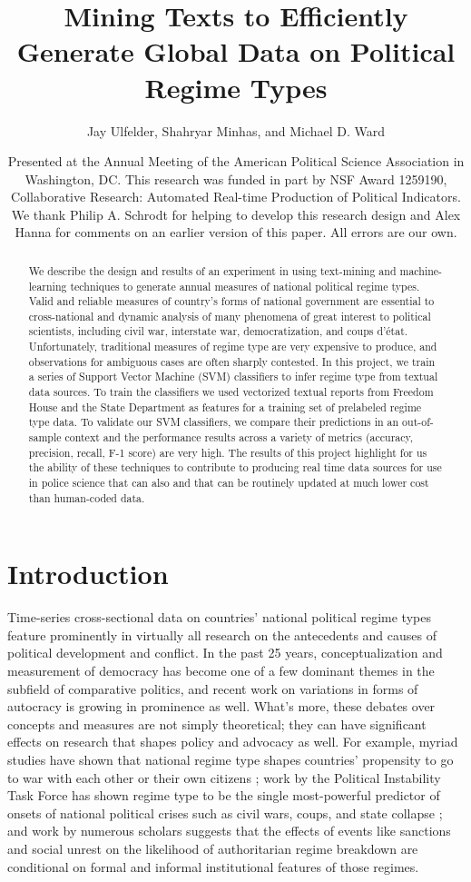 \documentclass[pdftex,12pt,fullpage,oneside]{amsart}
\title{Mining Texts to Efficiently Generate Global Data on Political Regime Types}
\author{Jay Ulfelder, Shahryar Minhas, and Michael D. Ward}
\date{Presented at the Annual Meeting of the American Political Science Association in Washington, DC. This research was funded in part by NSF Award 1259190, Collaborative Research: Automated Real-time Production of Political Indicators. We thank Philip A. Schrodt for helping to develop this research design and Alex Hanna for comments on an earlier version of this paper. All errors are our own.}
\begin{document}
\maketitle

\singlespacing
\begin{abstract}
We describe the design and results of an experiment in using text-mining and machine-learning techniques to generate annual measures of national political regime types. Valid and reliable measures of country's forms of national government are essential to cross-national and dynamic analysis of many phenomena of great interest to political scientists, including civil war, interstate war, democratization, and coups d'\'{e}tat. Unfortunately, traditional measures of regime type are very expensive to produce, and observations for ambiguous cases are often sharply contested. In this project, we train a series of Support Vector Machine (SVM) classifiers to infer regime type from textual data sources. To train the classifiers we used vectorized textual reports from Freedom House and the State Department as features for a training set of prelabeled regime type data. To validate our SVM classifiers, we compare their predictions in an out-of-sample context and the performance results across a variety of metrics (accuracy, precision, recall, F-1 score) are very high. The results of this project highlight for us the ability of these techniques to contribute to producing real time data sources for use in police science that can also and that can be routinely updated at much lower cost than human-coded data. 
\end{abstract} 

\newpage
\newpage\setcounter{page}{1} 
\doublespacing

\section{Introduction}

Time-series cross-sectional data on countries' national political regime types feature prominently in virtually all research on the antecedents and causes of political development and conflict. In the past 25 years, conceptualization and measurement of democracy has become one of a few dominant themes in the subfield of comparative politics, and recent work on variations in forms of autocracy is growing in prominence as well. What's more, these debates over concepts and measures are not simply theoretical; they can have significant effects on research that shapes policy and advocacy as well. For example, myriad studies have shown that national regime type shapes countries' propensity to go to war with each other or their own citizens \cite{hegre:2014}; work by the Political Instability Task Force has shown regime type to be the single most-powerful predictor of onsets of national political crises such as civil wars, coups, and state collapse \cite{goldstone2010global}; and work by numerous scholars suggests that the effects of events like sanctions \cite{geddes:2002,escriba-foch:wright:2010} and social unrest \cite{ulfelder:2005} on the likelihood of authoritarian regime breakdown are conditional on formal and informal institutional features of those regimes.
\end{document}
